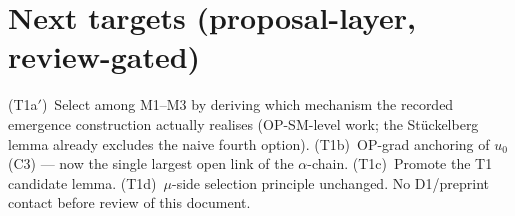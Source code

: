\documentclass[11pt,a4paper]{article}
\begin{document}
\section{Next targets (proposal-layer, review-gated)}
(T1a$'$)~Select among M1--M3 by deriving which mechanism the recorded emergence
construction actually realises (OP-SM-level work; the St\"uckelberg lemma already
excludes the naive fourth option). (T1b)~OP-grad anchoring of $u_0$ (C3) --- now
the single largest open link of the $\alpha$-chain. (T1c)~Promote the T1
candidate lemma. (T1d)~$\mu$-side selection principle unchanged. No D1/preprint
contact before review of this document.
\end{document}
